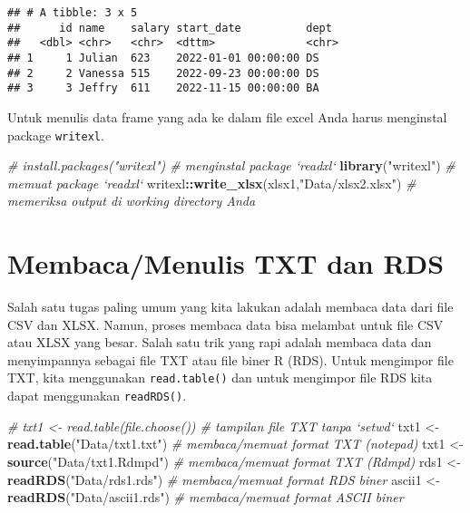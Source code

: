\documentclass[
]{book}
\newenvironment{Shaded}{\begin{snugshade}}{\end{snugshade}}
\newcommand{\CommentTok}[1]{\textcolor[rgb]{0.56,0.35,0.01}{\textit{#1}}}
\newcommand{\KeywordTok}[1]{\textcolor[rgb]{0.13,0.29,0.53}{\textbf{#1}}}
\newcommand{\NormalTok}[1]{#1}
\newcommand{\OperatorTok}[1]{\textcolor[rgb]{0.81,0.36,0.00}{\textbf{#1}}}
\newcommand{\StringTok}[1]{\textcolor[rgb]{0.31,0.60,0.02}{#1}}
\begin{document}
\begin{verbatim}
## # A tibble: 3 x 5
##      id name    salary start_date          dept 
##   <dbl> <chr>   <chr>  <dttm>              <chr>
## 1     1 Julian  623    2022-01-01 00:00:00 DS   
## 2     2 Vanessa 515    2022-09-23 00:00:00 DS   
## 3     3 Jeffry  611    2022-11-15 00:00:00 BA
\end{verbatim}

Untuk menulis data frame yang ada ke dalam file excel Anda harus menginstal package \texttt{writexl}.

\begin{Shaded}
\begin{Highlighting}[]
\CommentTok{# install.packages("writexl")                      # menginstal  package `readxl`}
\KeywordTok{library}\NormalTok{(}\StringTok{"writexl"}\NormalTok{)                                 }\CommentTok{# memuat package `readxl` }
\NormalTok{writexl}\OperatorTok{::}\KeywordTok{write_xlsx}\NormalTok{(xlsx1,}\StringTok{"Data/xlsx2.xlsx"}\NormalTok{)       }\CommentTok{# memeriksa output di working directory Anda}
\end{Highlighting}
\end{Shaded}

\hypertarget{membacamenulis-txt-dan-rds}{%
\section{Membaca/Menulis TXT dan RDS}\label{membacamenulis-txt-dan-rds}}

Salah satu tugas paling umum yang kita lakukan adalah membaca data dari file CSV dan XLSX. Namun, proses membaca data bisa melambat untuk file CSV atau XLSX yang besar. Salah satu trik yang rapi adalah membaca data dan menyimpannya sebagai file TXT atau file biner R (RDS). Untuk mengimpor file TXT, kita menggunakan \texttt{read.table()} dan untuk mengimpor file RDS kita dapat menggunakan \texttt{readRDS()}.

\begin{Shaded}
\begin{Highlighting}[]
\CommentTok{# txt1 <- read.table(file.choose())                # tampilan file TXT tanpa `setwd`}
\NormalTok{txt1 <-}\StringTok{ }\KeywordTok{read.table}\NormalTok{(}\StringTok{"Data/txt1.txt"}\NormalTok{)                }\CommentTok{# membaca/memuat format TXT (notepad)}
\NormalTok{txt1 <-}\StringTok{ }\KeywordTok{source}\NormalTok{(}\StringTok{"Data/txt1.Rdmpd"}\NormalTok{)                  }\CommentTok{# membaca/memuat format TXT (Rdmpd)}
\NormalTok{rds1 <-}\StringTok{ }\KeywordTok{readRDS}\NormalTok{(}\StringTok{"Data/rds1.rds"}\NormalTok{)                   }\CommentTok{# membaca/memuat format RDS biner}
\NormalTok{ascii1 <-}\StringTok{ }\KeywordTok{readRDS}\NormalTok{(}\StringTok{"Data/ascii1.rds"}\NormalTok{)               }\CommentTok{# membaca/memuat format ASCII biner}
\end{Highlighting}
\end{Shaded}
\end{document}
